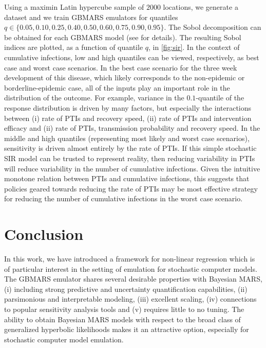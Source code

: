 \documentclass{article} %
\begin{document}
Using a maximin Latin hypercube sample of $2000$ locations, we generate a dataset and we train GBMARS emulators for quantiles $q \in \{0.05, 0.10, 0.25, 0.40, 0.50, 0.60, 0.75, 0.90, 0.95\}$. The Sobol decomposition can be obtained for each GBMARS model (see \cite{francom2018sensitivity} for details). The resulting Sobol indices are plotted, as a function of quantile $q$, in \cref{fig:sir}. In the context of cumulative infections, low and high quantiles can be viewed, respectively, as best case and worst case scenarios. In the best case scenario for the three week development of this disease, which likely corresponds to the non-epidemic or borderline-epidemic case, all of the inputs play an important role in the distribution of the outcome. For example, variance in the $0.1$-quantile of the response distribution is driven by many factors, but especially the interactions between (i) rate of PTIs and recovery speed, (ii) rate of PTIs and intervention efficacy and (ii) rate of PTIs, transmission probability and recovery speed. In the middle and high quantiles (representing most likely and worst case scenarios), sensitivity is driven almost entirely by the rate of PTIs. If this simple stochastic SIR model can be trusted to represent reality, then reducing variability in PTIs will reduce variability in the number of cumulative infections. Given the intuitive monotone relation between PTIs and cumulative infections, this suggests that policies geared towards reducing the rate of PTIs may be most effective strategy for reducing the number of cumulative infections in the worst case scenario. 


\section{Conclusion}
\label{sec:conclusion}

In this work, we have introduced a framework for non-linear regression which is of particular interest in the setting of emulation for stochastic computer models. The GBMARS emulator shares several desirable properties with Bayesian MARS, (i) including strong predictive and uncertainty quantification capabilities, (ii) parsimonious and interpretable modeling, (iii) excellent scaling, (iv) connections to popular sensitivity analysis tools and (v) requires little to no tuning. The ability to obtain Bayesian MARS models with respect to the broad class of generalized hyperbolic likelihoods makes it an attractive option, especially for stochastic computer model emulation.
\end{document}
